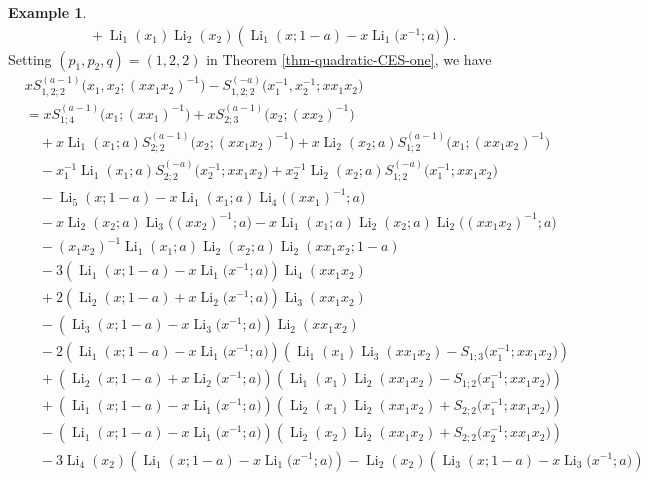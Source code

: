 \documentclass[11pt]{article}
\DeclareMathOperator{\Li}{Li}
\theoremstyle{plain}
\theoremstyle{definition}
\newtheorem{exa}[thm]{Example}
\begin{document}
\begin{exa}
\begin{align*}
	&\quad+\Li_{1}(x_1)\Li_{2}(x_2)\left(\Li_{1}(x;1-a)-x \Li_{1}\Big(x^{-1};a\Big)\right).
\end{align*}
Setting $(p_1,p_2,q)=(1,2,2)$ in Theorem \ref{thm-quadratic-CES-one}, we have
\begin{align*}
	&xS_{1,2;2}^{(a-1)}\Big(x_1,x_2;(xx_1x_2)^{-1}\Big)-S_{1,2;2}^{(-a)}\Big(x_1^{-1},x_2^{-1};xx_1x_2\Big)\nonumber\\
	&=xS_{1;4}^{(a-1)}\Big(x_1;(xx_1)^{-1}\Big)+xS_{2;3}^{(a-1)}\Big(x_2;(xx_2)^{-1}\Big)\nonumber\\
	&\quad+x\Li_{1}(x_1;a)S_{2;2}^{(a-1)}\Big(x_2;(xx_1x_2)^{-1}\Big)+x\Li_{2}(x_2;a)S_{1;2}^{(a-1)}\Big(x_1;(xx_1x_2)^{-1}\Big)\nonumber\\
	&\quad-x_1^{-1}\Li_{1}(x_1;a)S_{2;2}^{(-a)}\Big(x_2^{-1};xx_1x_2\Big)+x_2^{-1}\Li_{2}(x_2;a)S_{1;2}^{(-a)}\Big(x_1^{-1};xx_1x_2\Big)\nonumber\\
	&\quad-\Li_{5}(x;1-a)-x\Li_{1}(x_1;a)\Li_{4}\Big((xx_1)^{-1};a\Big)\nonumber\\&\quad-x \Li_{2}(x_2;a)\Li_{3}\Big((xx_2)^{-1};a\Big)-x\Li_{1}(x_1;a)\Li_{2}(x_2;a)\Li_2\Big((xx_1x_2)^{-1};a\Big)\nonumber\\
	&\quad-(x_1x_2)^{-1}\Li_{1}(x_1;a)\Li_{2}(x_2;a)\Li_2(xx_1x_2;1-a)\nonumber\\
	&\quad-3\left(\Li_{1}(x;1-a)-x\Li_{1}\Big(x^{-1};a\Big)\right)\Li_{4}(xx_1x_2)\nonumber\\
	&\quad+2\left(\Li_{2}(x;1-a)+x\Li_{2}\Big(x^{-1};a\Big)\right)\Li_{3}(xx_1x_2)\nonumber\\
	&\quad-\left(\Li_{3}(x;1-a)-x\Li_{3}\Big(x^{-1};a\Big)\right)\Li_{2}(xx_1x_2)\nonumber\\
	&\quad-2\left(\Li_{1}(x;1-a)-x\Li_{1}\Big(x^{-1};a\Big)\right)\left(\Li_{1}(x_1)\Li_{3}(xx_1x_2)-S_{1;3}\Big(x_1^{-1};xx_1x_2\Big)\right)\nonumber\\
	&\quad+\left(\Li_{2}(x;1-a)+x\Li_{2}\Big(x^{-1};a\Big)\right)\left(\Li_{1}(x_1)\Li_{2}(xx_1x_2)-S_{1;2}\Big(x_1^{-1};xx_1x_2\Big)\right)\nonumber\\
	&\quad+\left(\Li_{1}(x;1-a)-x\Li_{1}\Big(x^{-1};a\Big)\right)\left(\Li_{2}(x_1)\Li_{2}(xx_1x_2)+S_{2;2}\Big(x_1^{-1};xx_1x_2\Big)\right)\nonumber\\
	&\quad-\left(\Li_{1}(x;1-a)-x\Li_{1}\Big(x^{-1};a\Big)\right)\left(\Li_{2}(x_2)\Li_{2}(xx_1x_2)+S_{2;2}\Big(x_2^{-1};xx_1x_2\Big)\right)\\
	&\quad-3\Li_{4}(x_2)\left(\Li_{1}(x;1-a)-x\Li_{1}\Big(x^{-1};a\Big)\right)-\Li_{2}(x_2)\left(\Li_{3}(x;1-a)-x\Li_{3}\Big(x^{-1};a\Big)\right)\\

\end{align*}
\end{exa}
\end{document}
